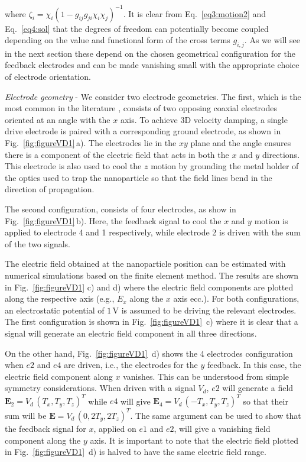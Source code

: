 \documentclass[aps,pra,twocolumn,nopacs,superscriptaddress,groupedaddress]{revtex4}
\begin{document}
\noindent where $\zeta_i=\chi_i (1-g_{ij} g_{ji} \chi_i \chi_j)^{-1}$. It is clear from Eq.~\ref{eq3:motion2} and Eq.~\ref{eq4:sol} that the degrees of freedom can potentially become coupled depending on the value and functional form of the cross terms $g_{i,j}$. As we will see in the next section these depend on the chosen geometrical configuration for the feedback electrodes and can be made vanishing small with the appropriate choice of electrode orientation.  


\emph{Electrode geometry} - We consider two electrode geometries. The first, which is the most common in the literature \cite{ricci2019accurate,iwasaki2019electric}, consists of two opposing coaxial electrodes oriented at an angle with the $x$ axis. To achieve 3D velocity damping, a single drive electrode is paired with a corresponding ground electrode, as shown in Fig.~\ref{fig:figureVD1}\,a). The electrodes lie in the $xy$ plane and the angle ensures there is a component of the electric field that acts in both the $x$ and $y$ directions. This electrode is also used to cool the $z$ motion by grounding the metal holder of the optics used to trap the nanoparticle so that the field lines bend in the direction of propagation.

The second configuration, consists of four electrodes, as show in Fig.~\ref{fig:figureVD1}\,b). Here, the feedback signal to cool the $x$ and $y$ motion is applied to electrode 4 and 1 respectively, while electrode 2 is driven with the sum of the two signals.

The electric field obtained at the nanoparticle position can be estimated with numerical simulations based on the finite element method.  The results are shown in Fig.~\ref{fig:figureVD1} c) and d) where the electric field components are plotted along the respective axis (e.g., $E_x$ along the $x$ axis ecc.). For both configurations, an electrostatic potential of $1$\,V is assumed to be driving the relevant electrodes. The first configuration is shown in Fig.~\ref{fig:figureVD1}~c) where it is clear that a signal will generate an electric field component in all three directions.

On the other hand, Fig.~\ref{fig:figureVD1}~d) shows the 4 electrodes configuration when  $e2$ and $e4$ are driven, i.e., the electrodes for the $y$ feedback. In this case, the electric field component along $x$ vanishes. This can be understood from simple symmetry considerations. When driven with a signal $V_d$, $e2$ will generate a field $\textbf{E}_2=V_d\,(T_x,T_y,T_z)^T$ while $e4$ will give $\textbf{E}_4=V_d\,(-T_x,T_y,T_z)^T$ so that their sum will be $\textbf{E}=V_d\,(0,2 T_y,2 T_z)^T$. The same argument can be used to show that the feedback signal for $x$, applied on $e1$ and $e2$, will give a vanishing field component along the $y$ axis. It is important to note that the electric field plotted in Fig.~\ref{fig:figureVD1}~d) is halved to have the same electric field range.
\end{document}
